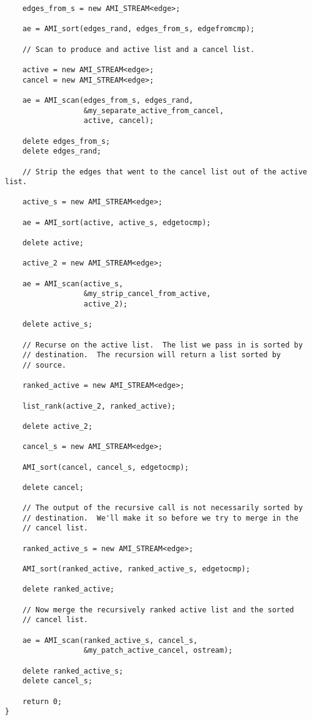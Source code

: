 \begin{verbatim}
    edges_from_s = new AMI_STREAM<edge>;

    ae = AMI_sort(edges_rand, edges_from_s, edgefromcmp);

    // Scan to produce and active list and a cancel list.

    active = new AMI_STREAM<edge>;
    cancel = new AMI_STREAM<edge>;

    ae = AMI_scan(edges_from_s, edges_rand,
                  &my_separate_active_from_cancel,
                  active, cancel);

    delete edges_from_s;
    delete edges_rand;
    
    // Strip the edges that went to the cancel list out of the active list.

    active_s = new AMI_STREAM<edge>;

    ae = AMI_sort(active, active_s, edgetocmp);

    delete active;

    active_2 = new AMI_STREAM<edge>;

    ae = AMI_scan(active_s,
                  &my_strip_cancel_from_active,
                  active_2);

    delete active_s;

    // Recurse on the active list.  The list we pass in is sorted by
    // destination.  The recursion will return a list sorted by
    // source.

    ranked_active = new AMI_STREAM<edge>;
    
    list_rank(active_2, ranked_active);

    delete active_2;

    cancel_s = new AMI_STREAM<edge>;

    AMI_sort(cancel, cancel_s, edgetocmp);

    delete cancel;

    // The output of the recursive call is not necessarily sorted by
    // destination.  We'll make it so before we try to merge in the
    // cancel list.

    ranked_active_s = new AMI_STREAM<edge>;

    AMI_sort(ranked_active, ranked_active_s, edgetocmp);

    delete ranked_active;
    
    // Now merge the recursively ranked active list and the sorted 
    // cancel list.

    ae = AMI_scan(ranked_active_s, cancel_s,
                  &my_patch_active_cancel, ostream);

    delete ranked_active_s;
    delete cancel_s;
    
    return 0;
}
\end{verbatim}

